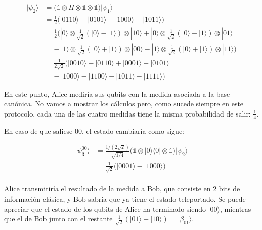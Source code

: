 \documentclass{article}
\begin{document}
\begin{align*}
  |\psi_2\rangle 
        &= \Big(
          \mathbb{1}
          \otimes H
          \otimes \mathbb{1}
          \otimes \mathbb{1}
          \Big)|\psi_1\rangle \\ 
        &= \frac{1}{2}\Big(
          |0110\rangle 
          + |0101\rangle 
          - |1000\rangle 
          - |1011\rangle
        \Big) \\ 
        &= \frac{1}{2}\Big(
          |0\rangle \otimes \frac{1}{\sqrt{2}}(
            |0\rangle - |1\rangle
          ) \otimes|10\rangle 
          + |0\rangle \otimes \frac{1}{\sqrt{2}}(
            |0\rangle - |1\rangle
          ) \otimes|01\rangle \\ 
          &\;\;\;\;- |1\rangle \otimes \frac{1}{\sqrt{2}}(
            |0\rangle + |1\rangle
          ) \otimes|00\rangle 
          - |1\rangle \otimes \frac{1}{\sqrt{2}}(
            |0\rangle + |1\rangle
          ) \otimes |11\rangle
        \Big) \\ 
        &= \frac{1}{2\sqrt{2}}\Big(
          |0010\rangle - |0110\rangle + |0001\rangle 
          - |0101\rangle \\ 
        &\;\;\;\; - |1000\rangle - |1100\rangle 
          - |1011\rangle - |1111\rangle
        \Big)
\end{align*}

En este punto, Alice mediría sus qubits con la medida asociada a la
base canónica. No vamos a mostrar los cálculos pero, como sucede
siempre en este protocolo, cada una de las cuatro medidas tiene la
misma probabilidad de salir: $\frac{1}{4}$.

En caso de que saliese $00$, el estado cambiaría como sigue:

\begin{align*}
  |\psi_3^{00}\rangle 
        &= \frac{1/(2\sqrt{2})}{\sqrt{1/4}}\Big(
          \mathbb{1}
          \otimes |0 \rangle\langle 0|
          \otimes \mathbb{1}
          \Big)|\psi_2\rangle \\ 
        &= \frac{1}{\sqrt{2}}\Big(
          |0001\rangle 
          - |1000\rangle 
        \Big) \\ 
\end{align*}

Alice transmitiría el resultado de la medida a Bob, que consiste en
$2$ bits de información clásica, y Bob sabría que ya tiene el estado
teleportado. Se puede apreciar que el estado de los qubits de Alice
ha terminado siendo $|00\rangle$, mientras que el de Bob junto con
el restante $\frac{1}{\sqrt{2}}(|01\rangle - |10\rangle)
= |\beta_{01}\rangle$.
\end{document}
